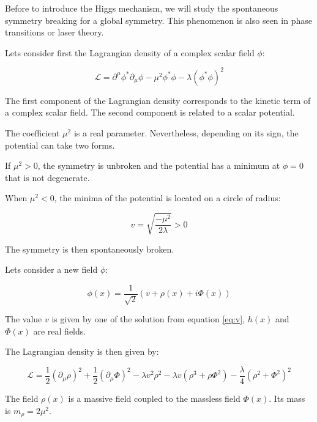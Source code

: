     Before to introduce the Higgs mechanism, we will study the spontaneous symmetry breaking for a global symmetry.
    This phenomenon is also seen in phase transitions or laser theory.

    Lets consider first the Lagrangian density of a complex scalar field $\phi$:

    \begin{equation}
      \mathcal{L} = \partial^{\mu}\phi^{*} \partial_{\mu}\phi - \mu^2\phi^{*}\phi - \lambda (\phi^{*}\phi)^2
    \end{equation}

    The first component of the Lagrangian density corresponds to the kinetic term of a complex scalar field.
    The second component is related to a scalar potential.

    The coefficient $\mu^2$ is a real parameter. Nevertheless, depending on its sign, the potential can take two forms.

    If $\mu^{2} > 0$, the symmetry is unbroken and the potential has a minimum at $\phi = 0$ that is not degenerate.

    When $\mu^{2} < 0$, the minima of the potential is located on a circle of radius: 

    \begin{equation}
      v = \sqrt{\frac{- \mu^2}{2\lambda}} > 0
      \label{eq:v}
    \end{equation}

    The symmetry is then spontaneously broken.

    Lets consider a new field $\phi$:

    \begin{equation}
      \phi(x) = \frac{1}{\sqrt{2}} \left( v + \rho(x) + i\Phi(x) \right)
    \end{equation}

    The value $v$ is given by one of the solution from equation \ref{eq:v}, $h(x)$ and $\Phi(x)$ are real fields.

    The Lagrangian density is then given by:

    \begin{equation}
      \mathcal{L} = \frac{1}{2} (\partial_{\mu}\rho)^2 + \frac{1}{2}(\partial_{\mu}\Phi)^2 - \lambda v^2 \rho^2 - \lambda v (\rho^3 +\rho \Phi^2) - \frac{\lambda}{4}(\rho^2 + \Phi^2)^2
    \end{equation}

    The field $\rho(x)$ is a massive field coupled to the massless field $\Phi(x)$.
    Its mass is $m_{\rho} = 2 \mu^2$.

